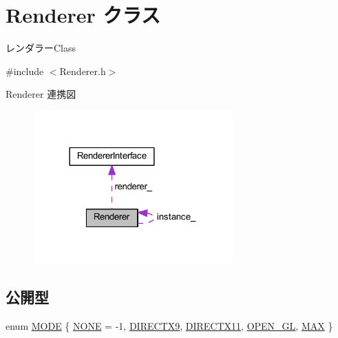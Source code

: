 \hypertarget{class_renderer}{}\section{Renderer クラス}
\label{class_renderer}


レンダラー\+Class  




{\ttfamily \#include $<$Renderer.\+h$>$}



Renderer 連携図
\nopagebreak
\begin{figure}[H]
\begin{center}
\leavevmode
\includegraphics[width=218pt]{class_renderer__coll__graph}
\end{center}
\end{figure}
\subsection*{公開型}
\begin{DoxyCompactItemize}
\item 
enum \mbox{\hyperlink{class_renderer_ab5a9379ccadcf2b3394c61cf8c835fec}{M\+O\+DE}} \{ \newline
\mbox{\hyperlink{class_renderer_ab5a9379ccadcf2b3394c61cf8c835feca2a36637bde744b1f383e4fa8c3c10382}{N\+O\+NE}} = -\/1, 
\mbox{\hyperlink{class_renderer_ab5a9379ccadcf2b3394c61cf8c835feca6b296a07c01bb9de6258ca507e7c4eb6}{D\+I\+R\+E\+C\+T\+X9}}, 
\mbox{\hyperlink{class_renderer_ab5a9379ccadcf2b3394c61cf8c835fecaf72f39863653ad6fe6cb501a566fb714}{D\+I\+R\+E\+C\+T\+X11}}, 
\mbox{\hyperlink{class_renderer_ab5a9379ccadcf2b3394c61cf8c835fecac532ec7ed1c2ce77df467cbf829e575a}{O\+P\+E\+N\+\_\+\+GL}}, 
\newline
\mbox{\hyperlink{class_renderer_ab5a9379ccadcf2b3394c61cf8c835feca3304c74929f96df4042bc148ee9f3b50}{M\+AX}}
 \}
\end{DoxyCompactItemize}
